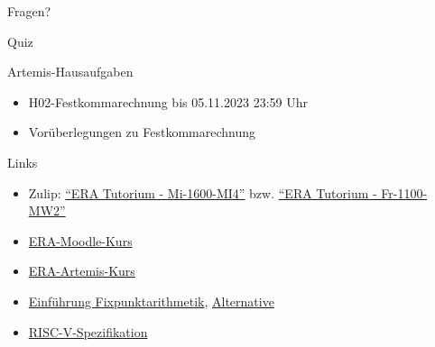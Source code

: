 \begin{frame}[c]{}{}
	\begin{center}
		\LARGE Fragen?
	\end{center}
\end{frame}

\begin{frame}[c]{}{}
	\begin{center}
		\LARGE Quiz
	\end{center}
\end{frame}

\begin{frame}[c]{Artemis-Hausaufgaben}{}
	\begin{itemize}
		\item H02-Festkommarechnung bis 05.11.2023 23:59 Uhr
		\item Vorüberlegungen zu Festkommarechnung
	\end{itemize}
\end{frame}

\begin{frame}[fragile, c]{Links}{}
	\begin{itemize}
		\item Zulip: \href{https://zulip.in.tum.de/#narrow/stream/1917-ERA-Tutorium---Mi-1600-MI4}{\enquote{ERA Tutorium - Mi-1600-MI4}}
		      bzw. \href{https://zulip.in.tum.de/#narrow/stream/1940-ERA-Tutorium---Fr-1100-MW2}{\enquote{ERA Tutorium - Fr-1100-MW2}}
		\item \href{https://www.moodle.tum.de/course/view.php?id=90679}{ERA-Moodle-Kurs}
		\item \href{https://artemis.in.tum.de/courses/288/exercises}{ERA-Artemis-Kurs}
		\item \href{https://vanhunteradams.com/FixedPoint/FixedPoint.html}{Einführung Fixpunktarithmetik}, \href{https://specbranch.com/posts/fixed-point/}{Alternative}
		\item \href{https://riscv.org/wp-content/uploads/2017/05/riscv-spec-v2.2.pdf}{RISC-V-Spezifikation}
	\end{itemize}
\end{frame}

\maketitle


